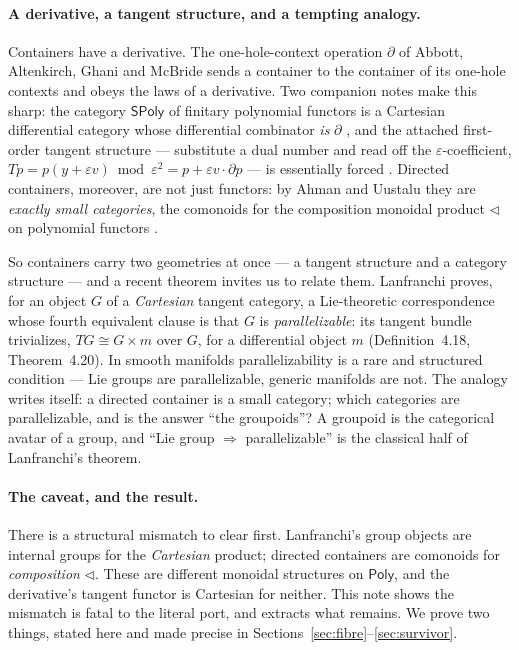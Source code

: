 \documentclass[11pt]{article}
\theoremstyle{definition}
\newcommand{\Poly}{\mathsf{Poly}}
\newcommand{\SPoly}{\mathsf{SPoly}}
\begin{document}
\paragraph{A derivative, a tangent structure, and a tempting analogy.}
Containers \cite{AAGM2003,GambinoKock2013} have a derivative. The one-hole-context operation
$\partial$ of Abbott, Altenkirch, Ghani and McBride sends a container to the container of its
one-hole contexts and obeys the laws of a derivative. Two companion notes make this sharp: the
category $\SPoly$ of finitary polynomial functors is a Cartesian differential category whose
differential combinator \emph{is} $\partial$ \cite{MacBethTangent}, and the attached first-order
tangent structure --- substitute a dual number and read off the $\varepsilon$-coefficient,
$Tp = p(y+\varepsilon v)\bmod\varepsilon^2 = p + \varepsilon v\cdot\partial p$ --- is essentially
forced \cite{MacBethUniqueness}. Directed containers, moreover, are not just functors: by
Ahman and Uustalu they are \emph{exactly small categories}, the comonoids for the composition
monoidal product $\lhd$ on polynomial functors \cite{AhmanUustalu2016}.

So containers carry two geometries at once --- a tangent structure and a category structure ---
and a recent theorem invites us to relate them. Lanfranchi \cite{Lanfranchi2026} proves, for an
object $G$ of a \emph{Cartesian} tangent category, a Lie-theoretic correspondence whose fourth
equivalent clause is that $G$ is \emph{parallelizable}: its tangent bundle trivializes,
$TG \cong G\times m$ over $G$, for a differential object $m$ (Definition~4.18, Theorem~4.20). In
smooth manifolds parallelizability is a rare and structured condition --- Lie groups are
parallelizable, generic manifolds are not. The analogy writes itself: a directed container is a
small category; which categories are parallelizable, and is the answer ``the groupoids''? A
groupoid is the categorical avatar of a group, and ``Lie group $\Rightarrow$ parallelizable'' is
the classical half of Lanfranchi's theorem.

\paragraph{The caveat, and the result.}
There is a structural mismatch to clear first. Lanfranchi's group objects are internal groups for
the \emph{Cartesian} product; directed containers are comonoids for \emph{composition} $\lhd$.
These are different monoidal structures on $\Poly$, and the derivative's tangent functor is
Cartesian for neither. This note shows the mismatch is fatal to the literal port, and extracts
what remains. We prove two things, stated here and made precise in
Sections~\ref{sec:fibre}--\ref{sec:survivor}.
\end{document}
